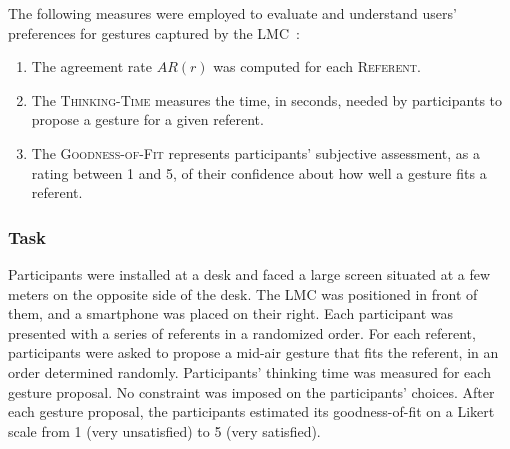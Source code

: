 The following measures were employed to evaluate and understand users' preferences for gestures captured by the LMC~\cite{Gheran:2018}:
\begin{enumerate}[noitemsep]
	\item The agreement rate $AR(r)$ was computed for each \textsc{Referent}.%

	\item The \textsc{Thinking-Time} measures the time, in seconds, needed by participants to propose a gesture for a given referent.
	
	\item The \textsc{Goodness-of-Fit} represents participants' subjective assessment, as a rating between 1 and 5, of their confidence about how well a gesture fits a referent.
\end{enumerate}

    

\subsubsection{Task}
Participants were installed at a desk and faced a large screen situated at a few meters on the opposite side of the desk. The LMC was positioned in front of them, and a smartphone was placed on their right. Each participant was presented with a series of referents in a randomized order. For each referent, participants were asked to propose a mid-air gesture that fits the referent, in an order determined randomly. Participants' thinking time was measured for each gesture proposal. No constraint was imposed on the participants' choices. After each gesture proposal, the participants estimated its goodness-of-fit on a Likert scale from 1 (very unsatisfied) to 5 (very satisfied).


